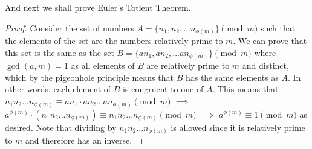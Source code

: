 And next we shall prove Euler's Totient Theorem.
\begin{proof}
    Consider the set of numbers $A = \{ n_1, n_2, ... n_{\phi(m)} \} \pmod{m}$ such that the elements of the set are the numbers relatively prime to $m$. We can prove that this set is the same as the set $B = \{ an_1, an_2, ... an_{\phi(m)} \} \pmod{m}$ where $\gcd(a, m) = 1$ as all elements of $B$ are relatively prime to $m$ and distinct, which by the pigeonhole principle means that $B$ has the same elements as $A.$ In other words, each element of $B$ is congruent to one of $A$. This means that $n_1 n_2 ... n_{\phi(m)} \equiv an_1 \cdot an_2 ... an_{\phi(m)} \pmod{m}$ $\implies$ $a^{\phi (m)} \cdot (n_1 n_2 ... n_{\phi(m)}) \equiv n_1 n_2 ... n_{\phi(m)} \pmod{m}$ $\implies$ $a^{\phi (m)} \equiv 1 \pmod{m}$ as desired. Note that dividing by $n_1 n_2 ... n_{\phi(m)}$ is allowed since it is relatively prime to $m$ and therefore has an inverse.
\end{proof}
